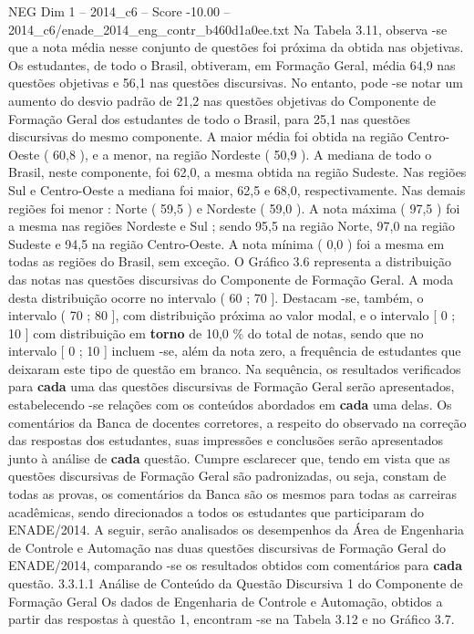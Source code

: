 \begin{textsample}{NEG Dim 1 – 2014\_c6 – Score -10.00 – 2014\_c6/enade\_2014\_eng\_contr\_b460d1a0ee.txt}
Na Tabela 3.11, observa -se que a nota média nesse conjunto de questões foi próxima da obtida nas objetivas.
Os estudantes, de todo o Brasil, obtiveram, em Formação Geral, média 64,9 nas questões objetivas e 56,1 nas questões discursivas.
No entanto, pode -se notar um aumento do desvio padrão de 21,2 nas questões objetivas do Componente de Formação Geral dos estudantes de todo o Brasil, para 25,1 nas questões discursivas do mesmo componente.
A maior média foi obtida na região Centro-Oeste ( 60,8 ), e a menor, na região Nordeste ( 50,9 ).
A mediana de todo o Brasil, neste componente, foi 62,0, a mesma obtida na região Sudeste.
Nas regiões Sul e Centro-Oeste a mediana foi maior, 62,5 e 68,0, respectivamente.
Nas demais regiões foi menor : Norte ( 59,5 ) e Nordeste ( 59,0 ).
A nota máxima ( 97,5 ) foi a mesma nas regiões Nordeste e Sul ; sendo 95,5 na região Norte, 97,0 na região Sudeste e 94,5 na região Centro-Oeste.
A nota mínima ( 0,0 ) foi a mesma em todas as regiões do Brasil, sem exceção.
O Gráfico 3.6 representa a distribuição das notas nas questões discursivas do Componente de Formação Geral.
A moda desta distribuição ocorre no intervalo ( 60 ; 70 ].
Destacam -se, também, o intervalo ( 70 ; 80 ], com distribuição próxima ao valor modal, e o intervalo [ 0 ; 10 ] com distribuição em \textbf{torno} de 10,0 \% do total de notas, sendo que no intervalo [ 0 ; 10 ] incluem -se, além da nota zero, a frequência de estudantes que deixaram este tipo de questão em branco.
Na sequência, os resultados verificados para \textbf{cada} uma das questões discursivas de Formação Geral serão apresentados, estabelecendo -se relações com os conteúdos abordados em \textbf{cada} uma delas.
Os comentários da Banca de docentes corretores, a respeito do observado na correção das respostas dos estudantes, suas impressões e conclusões serão apresentados junto à análise de \textbf{cada} questão.
Cumpre esclarecer que, tendo em vista que as questões discursivas de Formação Geral são padronizadas, ou seja, constam de todas as provas, os comentários da Banca são os mesmos para todas as carreiras acadêmicas, sendo direcionados a todos os estudantes que participaram do ENADE/2014.
A seguir, serão analisados os desempenhos da Área de Engenharia de Controle e Automação nas duas questões discursivas de Formação Geral do ENADE/2014, comparando -se os resultados obtidos com comentários para \textbf{cada} questão. 3.3.1.1 Análise de Conteúdo da Questão Discursiva 1 do Componente de Formação Geral Os dados de Engenharia de Controle e Automação, obtidos a partir das respostas à questão 1, encontram -se na Tabela 3.12 e no Gráfico 3.7.

\end{textsample}
